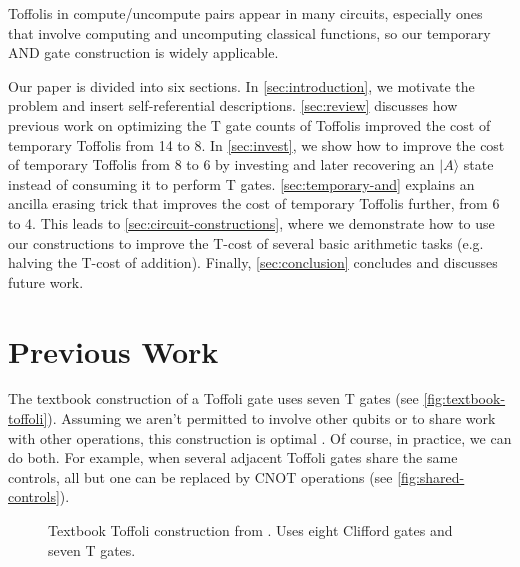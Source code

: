 \documentclass[twocolumn,longbibliography]{quantumarticle-customized}
\newcommand{\qH}{\gate{H}}
\newcommand{\qT}{\gate{T}}
\newcommand{\qTi}{\gate{T^\dagger}}
\begin{document}
Toffolis in compute/uncompute pairs appear in many circuits, especially ones that involve computing and uncomputing classical functions, so our temporary AND gate construction is widely applicable.

Our paper is divided into six sections.
In \autoref{sec:introduction}, we motivate the problem and insert self-referential descriptions.
\autoref{sec:review} discusses how previous work on optimizing the T gate counts of Toffolis improved the cost of temporary Toffolis from 14 to 8.
In \autoref{sec:invest}, we show how to improve the cost of temporary Toffolis from 8 to 6 by investing and later recovering an $|A\rangle$ state instead of consuming it to perform T gates.
\autoref{sec:temporary-and} explains an ancilla erasing trick that improves the cost of temporary Toffolis further, from 6 to 4.
This leads to \autoref{sec:circuit-constructions}, where we demonstrate how to use our constructions to improve the T-cost of several basic arithmetic tasks (e.g. halving the T-cost of addition).
Finally, \autoref{sec:conclusion} concludes and discusses future work.


\section{Previous Work}
\label{sec:review}

The textbook construction of a Toffoli gate uses seven T gates \cite{Nielsen2009} (see \autoref{fig:textbook-toffoli}).
Assuming we aren't permitted to involve other qubits or to share work with other operations, this construction is optimal \cite{Gosset2014}.
Of course, in practice, we can do both.
For example, when several adjacent Toffoli gates share the same controls, all but one can be replaced by CNOT operations (see \autoref{fig:shared-controls}).

\begin{figure}
  \resizebox{\linewidth}{!}{
    \Qcircuit @R=1.5em @C=0.7em {
      &\ctrl{1}&\qw & &   & & &\ctrl{1}&\qw  &\ctrl{1}&\qT &\qw     &\qw  &\ctrl{2}&\qw &\qw     &\qw  &\ctrl{2}&\qw &\qw \\
      &\ctrl{1}&\qw & & = & & &\targ   &\qTi &\targ   &\qT &\ctrl{1}&\qw  &\qw     &\qw &\ctrl{1}&\qw  &\qw     &\qw &\qw \\
      &\targ   &\qw & &   & & &\qw     &\qw  &\qH     &\qT &\targ   &\qTi &\targ   &\qT &\targ   &\qTi &\targ   &\qH &\qw \\
    }
  }
  \caption{
	Textbook Toffoli construction from \cite{Nielsen2009}.
	Uses eight Clifford gates and seven T gates.
  }
  \label{fig:textbook-toffoli}
\end{figure}
\end{document}
